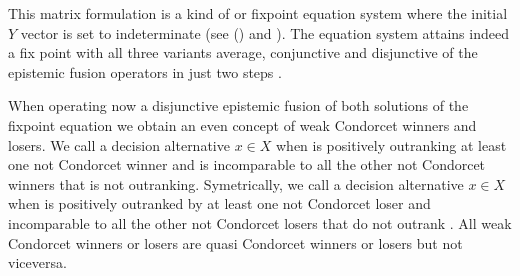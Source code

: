 \documentclass[a4paper,12pt,english]{sphinxhowto}
\begin{document}
\sphinxAtStartPar
This matrix formulation \sphinxstylestrong{(+)} is a kind of  or  fix\sphinxhyphen{}point equation system where the initial \(Y\) vector is set to indeterminate (see {\hyperref[\detokenize{pearls:bipolar-valued-kernels-tutorial-label}]{}} () and ). The equation system \sphinxstylestrong{(+)} attains indeed a fix point with all three variants \textendash{} average, conjunctive and disjunctive\textendash{} of the epistemic fusion operators in just two steps .

\sphinxAtStartPar
When operating now a disjunctive epistemic fusion of both solutions of the fix\sphinxhyphen{}point equation \sphinxstylestrong{(+)} we obtain an even  concept of weak Condorcet winners and losers. We call a decision alternative \(x \in X\)   when  is positively outranking at least one not Condorcet winner and is incomparable to all the other not Condorcet winners that  is not outranking. Symetrically, we call a decision alternative \(x \in X\)   when  is positively outranked by at least one not Condorcet loser and incomparable to all the other not Condorcet losers that do not outrank . All weak Condorcet winners or losers are quasi Condorcet winners or losers but not vice\sphinxhyphen{}versa.
\end{document}

